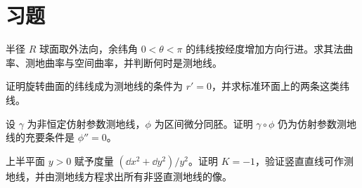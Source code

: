 \section{习题}
\begin{exercise}\label{ex:dg-geodesics-latitude}
半径 $R$ 球面取外法向，余纬角 $0<\theta<\pi$ 的纬线按经度增加方向行进。求其法曲率、测地曲率与空间曲率，并判断何时是测地线。
\end{exercise}
\begin{exercise}\label{ex:dg-geodesics-equator}
证明旋转曲面的纬线成为测地线的条件为 $r'=0$，并求标准环面上的两条这类纬线。
\end{exercise}
\begin{exercise}\label{ex:dg-geodesics-reparameter}
设 $\gamma$ 为非恒定仿射参数测地线，$\phi$ 为区间微分同胚。证明 $\gamma\circ\phi$ 仍为仿射参数测地线的充要条件是 $\phi''=0$。
\end{exercise}
\begin{exercise}\label{ex:dg-geodesics-hyperbolic}
上半平面 $y>0$ 赋予度量 $(\dd x^2+\dd y^2)/y^2$。证明 $K=-1$，验证竖直直线可作测地线，并由测地线方程求出所有非竖直测地线的像。
\end{exercise}

